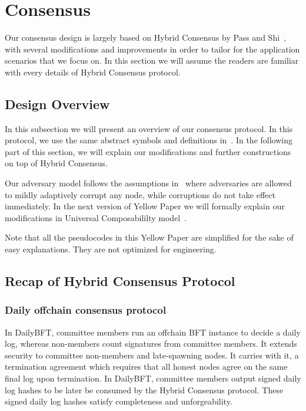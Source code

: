 \section{Consensus}
Our consensus design is largely based on Hybrid Consensus by Pass and Shi~\cite{pass2017hybrid}, with several modifications
and improvements in order to tailor for the application scenarios that we focus on. In this section we will assume the readers
are familiar with every details of Hybrid Consensus protocol.

\subsection{Design Overview}

In this subsection we will present an overview of our consensus protocol. In this protocol, we use the same abstract symbols and definitions
in~\cite{pass2017hybrid}. In the following part of this section, we will explain our modifications and further constructions on top of Hybrid Consensus.

Our adversary model follows the assumptions in~\cite{pass2017hybrid} where adversaries are allowed to mildly adaptively corrupt any node, while corruptions
do not take effect immediately. In the next version of Yellow Paper we will formally explain our modifications in
Universal Composabililty model~\cite{canetti2001universally}.

Note that all the pseudocodes in this Yellow Paper are simplified for the sake of easy explanations. They are not optimized for engineering.

\subsection{Recap of Hybrid Consensus Protocol}

\subsubsection{Daily offchain consensus protocol}

In DailyBFT, committee members run an offchain BFT instance to decide a daily log, whereas non-members count signatures from committee members.
It extends security to committee non-members and late-spawning nodes. It carries with it, a termination agreement which requires that all honest
nodes agree on the same final log upon termination. In DailyBFT, committee members output signed daily log hashes to be later be consumed by the
Hybrid Consensus protocol. These signed daily log hashes satisfy completeness and unforgeability.

